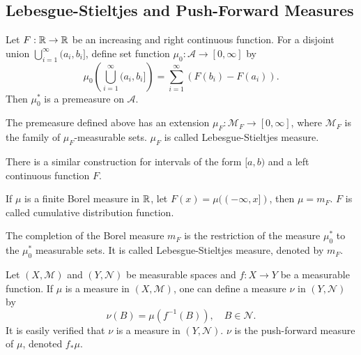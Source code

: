 \documentclass[class=book, crop=false]{standalone}
\begin{document}
        \subsection{Lebesgue-Stieltjes and Push-Forward Measures}
        \begin{theorem}
            Let $F : \mathbb{R} \rightarrow \mathbb{R}$ be an increasing and right continuous function. For a disjoint union $\bigcup^{\infty}_{i = 1} (a_i, b_i]$, define set function $\mu_0 : \mathscr{A} \rightarrow [0, \infty]$ by
            \begin{equation*}
                \mu_0\left(\bigcup^{\infty}_{i = 1} (a_i, b_i]\right) = \sum^{\infty}_{i = 1} (F(b_i) - F(a_i)).
            \end{equation*}
            Then $\mu^*_0$ is a premeasure on $\mathscr{A}$.
        \end{theorem}

        \begin{definition}
            The premeasure defined above has an extension $\mu_F : \mathscr{M}_F \rightarrow [0, \infty]$, where $\mathscr{M}_F$ is the family of $\mu_F$-measurable sets. $\mu_F$ is called Lebesgue-Stieltjes measure.
        \end{definition}
        
        \begin{remark}
            There is a similar construction for intervals of the form $[a, b)$ and a left continuous function $F$.
        \end{remark}

        \begin{theorem}
            If $\mu$ is a finite Borel measure in $\mathbb{R}$, let $F(x) = \mu((-\infty, x])$, then $\mu = m_F$. $F$ is called cumulative distribution function.
        \end{theorem}

        \begin{theorem}
            The completion of the Borel measure $m_F$ is the restriction of the measure $\mu^*_0$ to the $\mu^*_0$ measurable sets. It is called Lebesgue-Stieltjes measure, denoted by $m_F$.
        \end{theorem}

        \begin{definition}
            Let $(X, \mathscr{M})$ and $(Y, \mathscr{N})$ be measurable spaces and $f : X \rightarrow Y$ be a measurable function. If $\mu$ is a measure in $(X, \mathscr{M})$, one can define a measure $\nu$ in $(Y, \mathscr{N})$ by
            \begin{equation*}
                \nu(B) = \mu(f^{-1}(B)), \quad B \in \mathscr{N}.
            \end{equation*}
            It is easily verified that $\nu$ is a measure in $(Y, \mathscr{N})$. $\nu$ is the push-forward measure of $\mu$, denoted $f_*\mu$.
        \end{definition}
        
\end{document}
